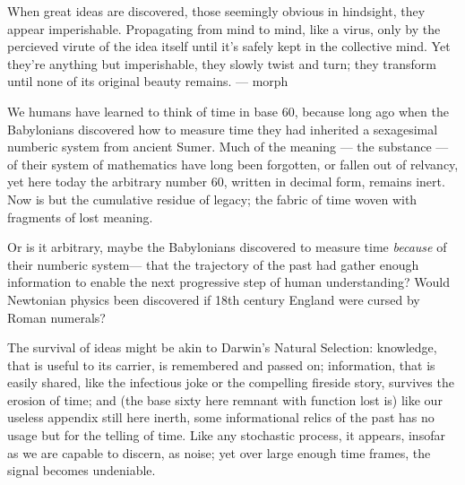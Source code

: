 

When great ideas are discovered, those seemingly obvious in hindsight, they appear imperishable. Propagating from mind to mind, like a virus, only by the percieved virute of the idea itself until it's safely kept in the collective mind. Yet they're anything but imperishable, they slowly twist and turn; they transform until none of its original beauty remains. --- morph

  We humans have learned to think of time in base 60, because long ago when the Babylonians discovered how to measure time they had inherited a sexagesimal numberic system from ancient Sumer. Much of the meaning — the substance — of their system of mathematics have long been forgotten, or fallen out of relvancy, yet here today the arbitrary number 60, written in decimal form, remains inert. Now is but the cumulative residue of legacy; the fabric of time woven with fragments of lost meaning.

Or is it arbitrary, maybe the Babylonians discovered to measure time \textit{because} of their numberic system— that the trajectory of the past had gather enough information to enable the next progressive step of human understanding? Would Newtonian physics been discovered if 18th century England were cursed by Roman numerals?


The survival of ideas might be akin to Darwin's Natural Selection: knowledge, that is useful to its carrier, is remembered and passed on; information, that is easily shared, like the infectious joke or the compelling fireside story, survives the erosion of time; and (the base sixty here remnant with function lost is) like our  useless appendix still here inerth, some informational relics of the past has no usage but for the telling of time. Like any stochastic process, it appears, insofar as we are capable to discern, as noise; yet over large enough time frames, the signal becomes undeniable.


